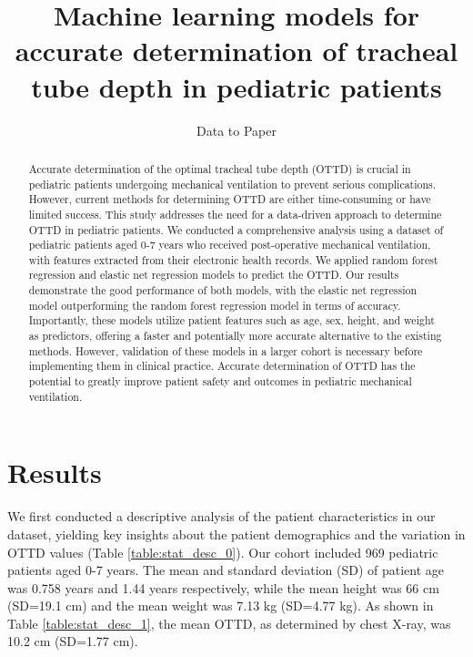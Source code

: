 \documentclass[11pt]{article}
\title{Machine learning models for accurate determination of tracheal tube depth in pediatric patients}
\author{Data to Paper}
\begin{document}
\maketitle
\begin{abstract}
Accurate determination of the optimal tracheal tube depth (OTTD) is crucial in pediatric patients undergoing mechanical ventilation to prevent serious complications. However, current methods for determining OTTD are either time-consuming or have limited success. This study addresses the need for a data-driven approach to determine OTTD in pediatric patients. We conducted a comprehensive analysis using a dataset of pediatric patients aged 0-7 years who received post-operative mechanical ventilation, with features extracted from their electronic health records. We applied random forest regression and elastic net regression models to predict the OTTD. Our results demonstrate the good performance of both models, with the elastic net regression model outperforming the random forest regression model in terms of accuracy. Importantly, these models utilize patient features such as age, sex, height, and weight as predictors, offering a faster and potentially more accurate alternative to the existing methods. However, validation of these models in a larger cohort is necessary before implementing them in clinical practice. Accurate determination of OTTD has the potential to greatly improve patient safety and outcomes in pediatric mechanical ventilation.
\end{abstract}
\section*{Results}

We first conducted a descriptive analysis of the patient characteristics in our dataset, yielding key insights about the patient demographics and the variation in OTTD values (Table {}\ref{table:stat_desc_0}). Our cohort included 969 pediatric patients aged 0-7 years. The mean and standard deviation (SD) of patient age was 0.758 years and 1.44 years respectively, while the mean height was 66 cm (SD=19.1 cm) and the mean weight was 7.13 kg (SD=4.77 kg). As shown in Table {}\ref{table:stat_desc_1}, the mean OTTD, as determined by chest X-ray, was 10.2 cm (SD=1.77 cm).
\end{document}
